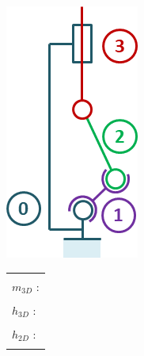 \documentclass[10pt,fleqn]{article} %
\begin{document}
\begin{multicols}{2}
\begin{minipage}[c]{.45\linewidth}
\begin{center}
\includegraphics[width=.8\linewidth]{images/cas_04.png}
\end{center}
\end{minipage} \hfill
\begin{minipage}[c]{.5\linewidth}
\begin{center}
\begin{tabular}{|p{3cm}|}
\hline 
\\
$m_{3D}$ : \\
\\
$h_{3D}$ : \\
\\
$h_{2D}$ : \\
\\
\hline
\end{tabular}
\end{center}
\end{minipage}



\end{multicols}
\end{document}

